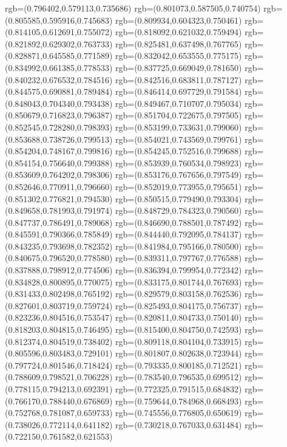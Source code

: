 {{{			rgb=(0.796402,0.579113,0.735686)
			rgb=(0.801073,0.587505,0.740754)
			rgb=(0.805585,0.595916,0.745683)
			rgb=(0.809934,0.604323,0.750461)
			rgb=(0.814105,0.612691,0.755072)
			rgb=(0.818092,0.621032,0.759494)
			rgb=(0.821892,0.629302,0.763733)
			rgb=(0.825481,0.637498,0.767765)
			rgb=(0.828871,0.645585,0.771589)
			rgb=(0.832042,0.653555,0.775175)
			rgb=(0.834992,0.661385,0.778533)
			rgb=(0.837725,0.669049,0.781650)
			rgb=(0.840232,0.676532,0.784516)
			rgb=(0.842516,0.683811,0.787127)
			rgb=(0.844575,0.690881,0.789484)
			rgb=(0.846414,0.697729,0.791584)
			rgb=(0.848043,0.704340,0.793438)
			rgb=(0.849467,0.710707,0.795034)
			rgb=(0.850679,0.716823,0.796387)
			rgb=(0.851704,0.722675,0.797505)
			rgb=(0.852545,0.728280,0.798393)
			rgb=(0.853199,0.733631,0.799060)
			rgb=(0.853688,0.738726,0.799513)
			rgb=(0.854021,0.743569,0.799761)
			rgb=(0.854204,0.748167,0.799816)
			rgb=(0.854245,0.752516,0.799688)
			rgb=(0.854154,0.756640,0.799388)
			rgb=(0.853939,0.760534,0.798923)
			rgb=(0.853609,0.764202,0.798306)
			rgb=(0.853176,0.767656,0.797549)
			rgb=(0.852646,0.770911,0.796660)
			rgb=(0.852019,0.773955,0.795651)
			rgb=(0.851302,0.776821,0.794530)
			rgb=(0.850515,0.779490,0.793304)
			rgb=(0.849658,0.781993,0.791974)
			rgb=(0.848729,0.784323,0.790560)
			rgb=(0.847737,0.786491,0.789068)
			rgb=(0.846690,0.788501,0.787492)
			rgb=(0.845591,0.790366,0.785849)
			rgb=(0.844440,0.792095,0.784137)
			rgb=(0.843235,0.793698,0.782352)
			rgb=(0.841984,0.795166,0.780500)
			rgb=(0.840675,0.796520,0.778580)
			rgb=(0.839311,0.797767,0.776588)
			rgb=(0.837888,0.798912,0.774506)
			rgb=(0.836394,0.799954,0.772342)
			rgb=(0.834828,0.800895,0.770075)
			rgb=(0.833175,0.801744,0.767693)
			rgb=(0.831433,0.802498,0.765192)
			rgb=(0.829579,0.803158,0.762536)
			rgb=(0.827601,0.803719,0.759724)
			rgb=(0.825493,0.804175,0.756737)
			rgb=(0.823236,0.804516,0.753547)
			rgb=(0.820811,0.804733,0.750140)
			rgb=(0.818203,0.804815,0.746495)
			rgb=(0.815400,0.804750,0.742593)
			rgb=(0.812374,0.804519,0.738402)
			rgb=(0.809118,0.804104,0.733915)
			rgb=(0.805596,0.803483,0.729101)
			rgb=(0.801807,0.802638,0.723944)
			rgb=(0.797724,0.801546,0.718424)
			rgb=(0.793335,0.800185,0.712521)
			rgb=(0.788609,0.798521,0.706228)
			rgb=(0.783540,0.796535,0.699512)
			rgb=(0.778115,0.794213,0.692391)
			rgb=(0.772325,0.791515,0.684832)
			rgb=(0.766170,0.788440,0.676869)
			rgb=(0.759644,0.784968,0.668493)
			rgb=(0.752768,0.781087,0.659733)
			rgb=(0.745556,0.776805,0.650619)
			rgb=(0.738026,0.772114,0.641182)
			rgb=(0.730218,0.767033,0.631484)
			rgb=(0.722150,0.761582,0.621553)
}}}
